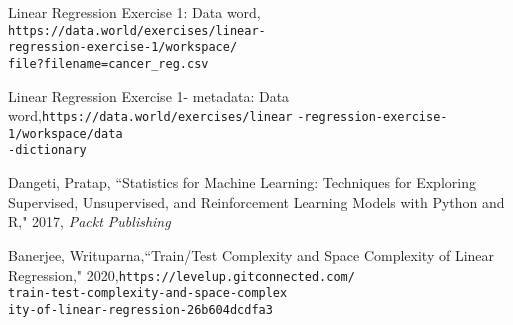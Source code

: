 \documentclass[twocolumn]{article}
\begin{document}
\begin{thebibliography}{100} %

Linear Regression Exercise 1: Data word,
\\\texttt{https://data.world/exercises/linear-}
\\\texttt{regression-exercise-1/workspace/}
\\\texttt{file?filename=cancer_reg.csv}

Linear Regression Exercise 1- metadata: Data word,\texttt{https://data.world/exercises/linear}
\texttt{-regression-exercise-1/workspace/data}
\\\texttt{-dictionary}

 Dangeti, Pratap, ``Statistics for Machine Learning: Techniques for Exploring Supervised, Unsupervised, and Reinforcement Learning Models with Python and R," 2017, \emph{Packt Publishing}

Banerjee, Writuparna,``Train/Test Complexity and Space Complexity of Linear Regression," 2020,\texttt{https://levelup.gitconnected.com/}
\\\texttt{train-test-complexity-and-space-complex}
\\\texttt{ity-of-linear-regression-26b604dcdfa3}

\end{thebibliography}
\end{document}
